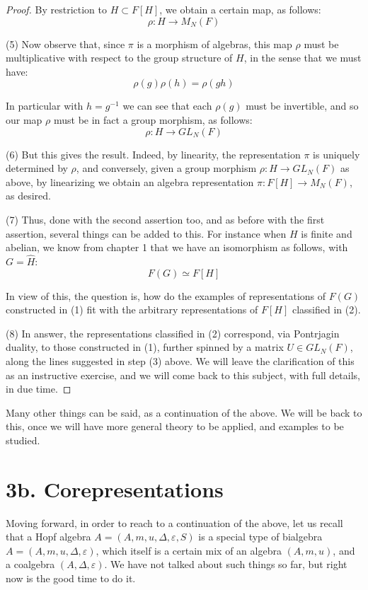 \documentclass[12pt]{amsbook}
\begin{document}
\begin{proof}
By restriction to $H\subset F[H]$, we obtain a certain map, as follows:
$$\rho:H\to M_N(F)$$

(5) Now observe that, since $\pi$ is a morphism of algebras, this map $\rho$ must be multiplicative with respect to the group structure of $H$, in the sense that we must have:
$$\rho(g)\rho(h)=\rho(gh)$$

In particular with $h=g^{-1}$ we can see that each $\rho(g)$ must be invertible, and so our map $\rho$ must be in fact a group morphism, as follows:
$$\rho:H\to GL_N(F)$$

(6) But this gives the result. Indeed, by linearity, the representation $\pi$ is uniquely determined by $\rho$, and conversely, given a group morphism $\rho:H\to GL_N(F)$ as above, by linearizing we obtain an algebra representation $\pi:F[H]\to M_N(F)$, as desired.

\medskip

(7) Thus, done with the second assertion too, and as before with the first assertion, several things can be added to this. For instance when $H$ is finite and abelian, we know from chapter 1 that we have an isomorphism as follows, with $G=\widehat{H}$:
$$F(G)\simeq F[H]$$

In view of this, the question is, how do the examples of representations of $F(G)$ constructed in (1) fit with the arbitrary representations of $F[H]$ classified in (2).

\medskip

(8) In answer, the representations classified in (2) correspond, via Pontrjagin duality, to those constructed in (1), further spinned by a matrix $U\in GL_N(F)$, along the lines suggested in step (3) above. We will leave the clarification of this as an instructive exercise, and we will come back to this subject, with full details, in due time.
\end{proof}

Many other things can be said, as a continuation of the above. We will be back to this, once we will have more general theory to be applied, and examples to be studied.

\section*{3b. Corepresentations} 

Moving forward, in order to reach to a continuation of the above, let us recall that a Hopf algebra $A=(A,m,u,\Delta,\varepsilon,S)$ is a special type of bialgebra $A=(A,m,u,\Delta,\varepsilon)$, which itself is a certain mix of an algebra $(A,m,u)$, and a coalgebra $(A,\Delta,\varepsilon)$. We have not talked about such things so far, but right now is the good time to do it.
\end{document}
